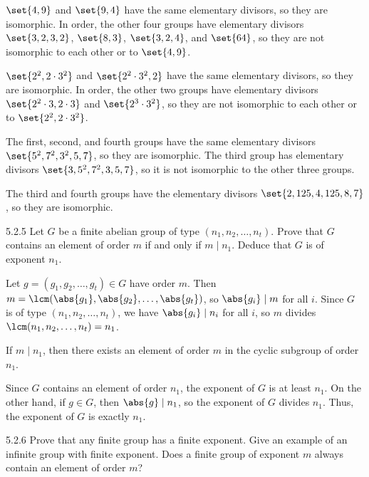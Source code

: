 \begin{solenum}
    \item $\set{4, 9}$ and $\set{9, 4}$ have the same elementary divisors, so they are isomorphic.
	In order, the other four groups have elementary divisors $\set{3, 2, 3, 2}$, $\set{8, 3}$, $\set{3, 2, 4}$, and $\set{64}$, so they are not isomorphic to each other or to $\set{4, 9}$.
    \item $\set{2^2, 2 \cdot 3^2}$ and $\set{2^2 \cdot 3^2, 2}$ have the same elementary divisors, so they are isomorphic.
	In order, the other two groups have elementary divisors $\set{2^2 \cdot 3, 2 \cdot 3}$ and $\set{2^3 \cdot 3^2}$, so they are not isomorphic to each other or to $\set{2^2, 2 \cdot 3^2}$.
    \item The first, second, and fourth groups have the same elementary divisors $\set{5^2, 7^2, 3^2, 5, 7}$, so they are isomorphic.
	The third group has elementary divisors $\set{3, 5^2, 7^2, 3, 5, 7}$, so it is not isomorphic to the other three groups.
    \item The third and fourth groups have the elementary divisors $\set{2, 125, 4, 125, 8, 7}$, so they are isomorphic.
\end{solenum}

\begin{exercise}{5.2.5}
    Let $G$ be a finite abelian group of type $(n_1, n_2, \ldots, n_t)$.
	Prove that $G$ contains an element of order $m$ if and only if $m \mid n_1$.
	Deduce that $G$ is of exponent $n_1$.
\end{exercise}

\begin{soliff}
    \rightimp Let $g = (g_1, g_2, \ldots, g_t) \in G$ have order $m$.
	Then $m = \lcm(\abs{g_1}, \abs{g_2}, \ldots, \abs{g_t})$, so $\abs{g_i} \mid m$ for all $i$.
	Since $G$ is of type $(n_1, n_2, \ldots, n_t)$, we have $\abs{g_i} \mid n_i$ for all $i$, so $m$ divides $\lcm(n_1, n_2, \ldots, n_t) = n_1$.

    \leftimp If $m \mid n_1$, then there exists an element of order $m$ in the cyclic subgroup of order $n_1$.

    Since $G$ contains an element of order $n_1$, the exponent of $G$ is at least $n_1$.
	On the other hand, if $g \in G$, then $\abs{g} \mid n_1$, so the exponent of $G$ divides $n_1$.
	Thus, the exponent of $G$ is exactly $n_1$.
\end{soliff}

\begin{exercise}{5.2.6}
    Prove that any finite group has a finite exponent.
	Give an example of an infinite group with finite exponent.
	Does a finite group of exponent $m$ always contain an element of order $m$?
\end{exercise}

